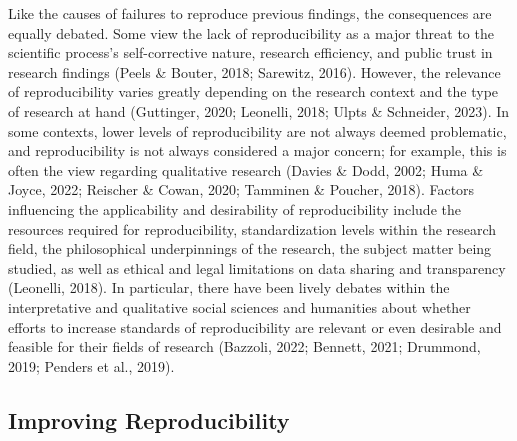 \documentclass[authordate, meta]{jote-new-article}
\begin{document}
	Like the causes of failures to reproduce previous findings, the consequences are equally debated. Some view the lack of reproducibility as a major threat to the scientific process's self-corrective nature, research efficiency, and public trust in research findings (Peels \& Bouter, 2018; Sarewitz, 2016). However, the relevance of reproducibility varies greatly depending on the research context and the type of research at hand (Guttinger, 2020; Leonelli, 2018; Ulpts \& Schneider, 2023). In some contexts, lower levels of reproducibility are not always deemed problematic, and reproducibility is not always considered a major concern; for example, this is often the view regarding qualitative research (Davies \& Dodd, 2002; Huma \& Joyce, 2022; Reischer \& Cowan, 2020; Tamminen \& Poucher, 2018). Factors influencing the applicability and desirability of reproducibility include the resources required for reproducibility, standardization levels within the research field, the philosophical underpinnings of the research, the subject matter being studied, as well as ethical and legal limitations on data sharing and transparency (Leonelli, 2018). In particular, there have been lively debates within the interpretative and qualitative social sciences and humanities about whether efforts to increase standards of reproducibility are relevant or even desirable and feasible for their fields of research (Bazzoli, 2022; Bennett, 2021; Drummond, 2019; Penders et al., 2019).



	\subsection{Improving Reproducibility}
\end{document}
